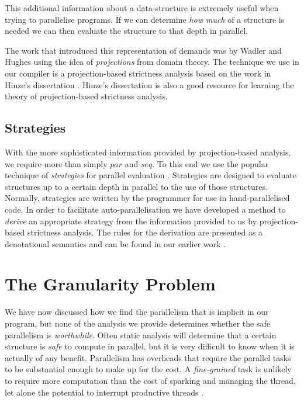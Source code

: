 This additional information about a data-structure is extremely useful when
trying to parallelise programs. If we can determine \emph{how much} of a
structure is needed we can then evaluate the structure to that depth in
parallel.


The work that introduced this representation of demands was by Wadler and
Hughes \citep{wadler1987projections} using the idea of \emph{projections} from
domain theory.  The technique we use in our compiler is a projection-based
strictness analysis based on the work in Hinze's dissertation
\citep{hinze1995projection}.  Hinze's dissertation is also a good resource for
learning the theory of projection-based strictness analysis.


\subsection*{Strategies}

With the more sophisticated information provided by projection-based analysis,
we require more than simply $par$ and $seq$. To this end we use the popular
technique of \emph{strategies} for parallel evaluation \citep{strategies,
marlow2010seq}. Strategies are designed to evaluate structures up to a certain
depth in parallel to the use of those structures. Normally, strategies are
written by the programmer for use in hand-parallelised code. In order to
facilitate auto-parallelisation we have developed a method to \emph{derive} an
appropriate strategy from the information provided to us by projection-based
strictness analysis. The rules for the derivation are presented as a
denotational semantics and can be found in our earlier work \citep{calderon}.

\section{The Granularity Problem}

We have now discussed how we find the parallelism that is implicit in our
program, but none of the analysis we provide determines whether the safe
parallelism is \emph{worthwhile}. Often static analysis will determine that a
certain structure is \emph{safe} to compute in parallel, but it is very
difficult to know when it is actually of any benefit. Parallelism has overheads
that require the parallel tasks to be substantial enough to make up for the
cost. A \emph{fine-grained} task is unlikely to require more computation than
the cost of sparking and managing the thread, let alone the potential to
interrupt productive threads \citep{hammond2000research, hogen1992automatic}.

